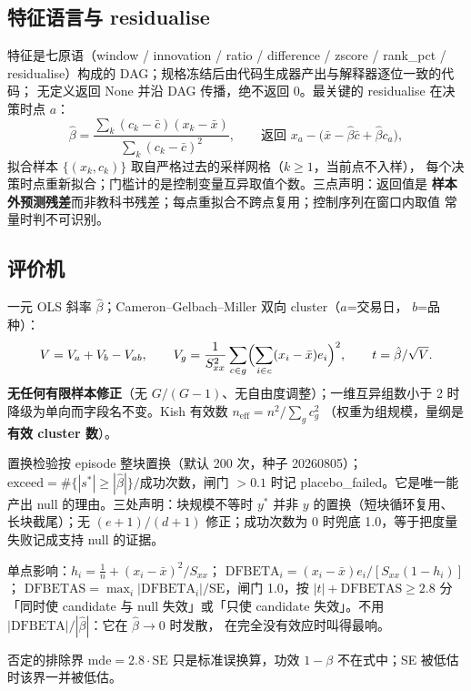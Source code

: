 \documentclass[11pt]{ctexart}
\begin{document}
\subsection{特征语言与 residualise}
特征是七原语（window / innovation / ratio / difference / zscore / rank\_pct /
residualise）构成的 DAG；规格冻结后由代码生成器产出与解释器逐位一致的代码；
无定义返回 None 并沿 DAG 传播，绝不返回 0。最关键的 residualise 在决策时点 $a$：
\[ \hat\beta=\frac{\sum_k (c_k-\bar c)(x_k-\bar x)}{\sum_k (c_k-\bar c)^2},\qquad
   \text{返回 } x_a-\bigl(\bar x-\hat\beta\bar c+\hat\beta c_a\bigr), \]
拟合样本 $\{(x_k,c_k)\}$ 取自严格过去的采样网格（$k\ge 1$，当前点不入样），
每个决策时点重新拟合；门槛计的是控制变量互异取值个数。三点声明：返回值是
\textbf{样本外预测残差}而非教科书残差；每点重拟合不跨点复用；控制序列在窗口内取值
常量时判不可识别。

\subsection{评价机}
一元 OLS 斜率 $\hat\beta$；Cameron--Gelbach--Miller 双向 cluster（$a$=交易日，
$b$=品种）：
\[ V=V_a+V_b-V_{ab},\qquad V_g=\frac{1}{S_{xx}^2}\sum_{c\in g}
   \Bigl(\sum_{i\in c}(x_i-\bar x)e_i\Bigr)^2,\qquad t=\hat\beta/\sqrt{V}. \]
\textbf{无任何有限样本修正}（无 $G/(G-1)$、无自由度调整）；一维互异组数小于 2 时
降级为单向而字段名不变。Kish 有效数 $n_{\mathrm{eff}}=n^2/\sum_g c_g^2$
（权重为组规模，量纲是\textbf{有效 cluster 数}）。

置换检验按 episode 整块置换（默认 200 次，种子 20260805）；
$\text{exceed}=\#\{|s^\ast|\ge|\hat\beta|\}/\text{成功次数}$，闸门 $>0.1$ 时记
placebo\_failed。它是唯一能产出 null 的理由。三处声明：块规模不等时 $y^\ast$
并非 $y$ 的置换（短块循环复用、长块截尾）；无 $(e{+}1)/(d{+}1)$ 修正；成功次数为 0
时兜底 1.0，等于把度量失败记成支持 null 的证据。

单点影响：$h_i=\tfrac1n+(x_i-\bar x)^2/S_{xx}$；
$\mathrm{DFBETA}_i=(x_i-\bar x)e_i/[S_{xx}(1-h_i)]$；
$\mathrm{DFBETAS}=\max_i|\mathrm{DFBETA}_i|/\mathrm{SE}$，闸门 1.0，按
$|t|+\mathrm{DFBETAS}\ge 2.8$ 分「同时使 candidate 与 null 失效」或「只使 candidate
失效」。不用 $|\mathrm{DFBETA}|/|\hat\beta|$：它在 $\hat\beta\to0$ 时发散，
在完全没有效应时叫得最响。

否定的排除界 $\mathrm{mde}=2.8\cdot\mathrm{SE}$ 只是标准误换算，功效 $1-\beta$
不在式中；SE 被低估时该界一并被低估。
\end{document}
